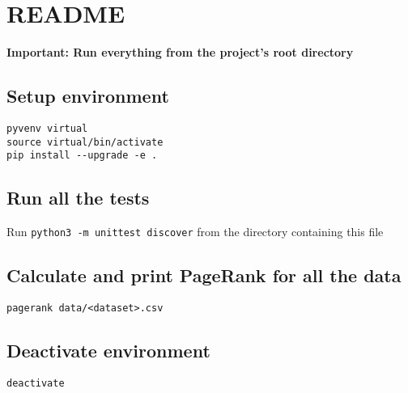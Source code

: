 \documentclass{report}
\begin{document}
\section{README}
\lstset{lang=bash}
\textbf{Important: Run everything from the project's root directory}

\subsection{Setup environment}
\begin{lstlisting}
pyvenv virtual
source virtual/bin/activate
pip install --upgrade -e .
\end{lstlisting}

\subsection{Run all the tests}
Run \verb+python3 -m unittest discover+ from the directory containing
this file

\subsection{Calculate and print PageRank for all the data}
\begin{lstlisting}
pagerank data/<dataset>.csv
\end{lstlisting}

\subsection{Deactivate environment}
\begin{lstlisting}
deactivate
\end{lstlisting}
\end{document}
